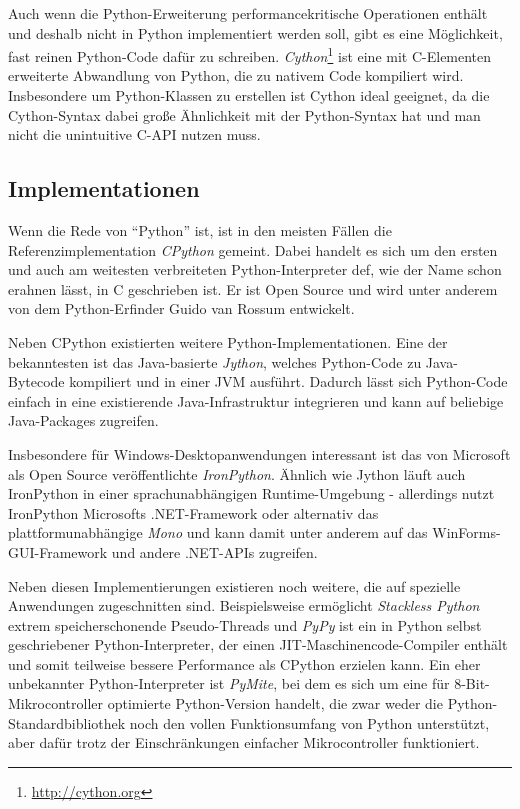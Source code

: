 

Auch wenn die Python-Erweiterung performancekritische Operationen enthält und deshalb nicht in
Python implementiert werden soll, gibt es eine Möglichkeit, fast reinen Python-Code dafür zu
schreiben. \emph{Cython}\footnote{\href{http://cython.org}{http://cython.org}} ist eine mit
C-Elementen erweiterte Abwandlung von Python, die zu nativem Code kompiliert wird. Insbesondere um
Python-Klassen zu erstellen ist Cython ideal geeignet, da die Cython-Syntax dabei große Ähnlichkeit
mit der Python-Syntax hat und man nicht die unintuitive C-API nutzen muss.


\subsection{Implementationen}

Wenn die Rede von \enquote{Python} ist, ist in den meisten Fällen die Referenzimplementation
\emph{CPython} gemeint. Dabei handelt es sich um den ersten und auch am weitesten verbreiteten
Python-Interpreter def, wie der Name schon erahnen lässt, in C geschrieben ist. Er ist Open Source
und wird unter anderem von dem Python-Erfinder Guido van Rossum entwickelt.

Neben CPython existierten weitere Python-Implementationen. Eine der bekanntesten ist das
Java-basierte \emph{Jython}, welches Python-Code zu Java-Bytecode kompiliert und in einer JVM
ausführt. Dadurch lässt sich Python-Code einfach in eine existierende Java-Infrastruktur integrieren
und kann auf beliebige Java-Packages zugreifen.

Insbesondere für Windows-Desktopanwendungen interessant ist das von Microsoft als Open Source
veröffentlichte \emph{IronPython}. Ähnlich wie Jython läuft auch IronPython in einer
sprachunabhängigen Runtime-Umgebung - allerdings nutzt IronPython Microsofts .NET-Framework oder
alternativ das plattformunabhängige \emph{Mono} und kann damit unter anderem auf das
WinForms-GUI-Framework und andere .NET-APIs zugreifen.

Neben diesen Implementierungen existieren noch weitere, die auf spezielle Anwendungen zugeschnitten
sind. Beispielsweise ermöglicht \emph{Stackless Python} extrem speicherschonende Pseudo-Threads und
\emph{PyPy} ist ein in Python selbst geschriebener Python-Interpreter, der einen
JIT-Maschinencode-Compiler enthält und somit teilweise bessere Performance als CPython erzielen
kann. Ein eher unbekannter Python-Interpreter ist \emph{PyMite}, bei dem es sich um eine für
8-Bit-Mikrocontroller optimierte Python-Version handelt, die zwar weder die
Python-Standardbibliothek noch den vollen Funktionsumfang von Python unterstützt, aber dafür trotz
der Einschränkungen einfacher Mikrocontroller funktioniert.


